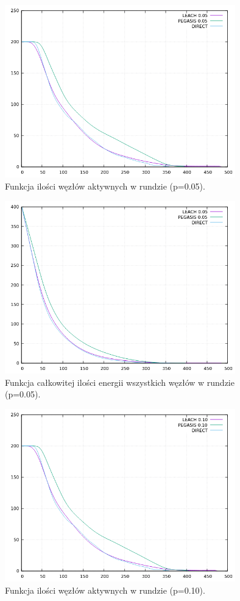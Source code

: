 \documentclass[a4paper,12pt,twoside,openany]{report}
\begin{document}
\begin{figure}[H]
 \centering
 \includegraphics[width=10cm]{images/gnuplot/test_4/nodes_in_round_p005.png}
 \caption{Funkcja ilości węzłów aktywnych w rundzie (p=0.05).}
\end{figure}

\begin{figure}[H]
 \centering
 \includegraphics[width=10cm]{images/gnuplot/test_4/energy_in_round_p005.png}
 \caption{Funkcja całkowitej ilości energii wszystkich węzłów w rundzie (p=0.05).}
\end{figure}

\begin{figure}[H]
 \centering
 \includegraphics[width=10cm]{images/gnuplot/test_4/nodes_in_round_p010.png}
 \caption{Funkcja ilości węzłów aktywnych w rundzie (p=0.10).}
\end{figure}
\end{document}
